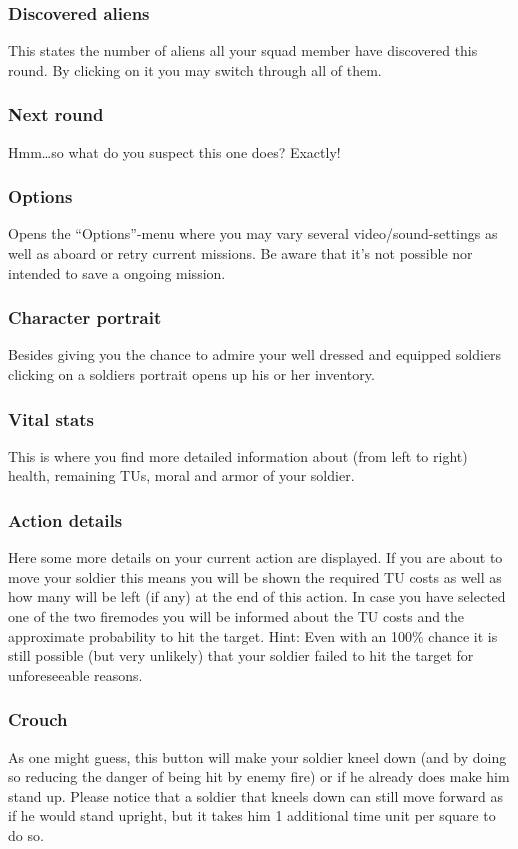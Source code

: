 \subsubsection{Discovered aliens}
This states the number of aliens all your squad member have discovered this round. By clicking on it you may switch through all of them.
\subsubsection{Next round}
Hmm\ldots so what do you suspect this one does? Exactly!
\subsubsection{Options}
Opens the ``Options''-menu where you may vary several video/sound-settings as well as aboard or retry current missions. Be aware that it's not possible nor intended to save a ongoing mission.
\subsubsection{Character portrait}
Besides giving you the chance to admire your well dressed and equipped soldiers clicking on a soldiers portrait opens up his or her inventory.
\subsubsection{Vital stats}
This is where you find more detailed information about (from left to right) health, remaining TUs, moral and armor of your soldier.
\subsubsection{Action details}
Here some more details on your current action are displayed. If you are about to move your soldier this means you will be shown the required TU costs as well as how many will be left (if any) at the end of this action. In case you have selected one of the two firemodes you will be informed about the TU costs and the approximate probability to hit the target. Hint: Even with an 100\% chance it is still possible (but very unlikely) that your soldier failed to hit the target for unforeseeable  reasons.
\subsubsection{Crouch}
As one might guess, this button will make your soldier kneel down (and by doing so reducing the danger of being hit by enemy fire) or if he already does make him stand up. Please notice that a soldier that kneels down can still move forward as if he would stand upright, but it takes him 1 additional time unit per square to do so.
